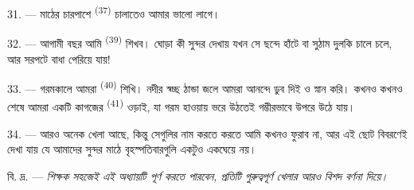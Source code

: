 31. --- মাঠের চারপাশে  \textsuperscript{(37)} চালাতেও আমার ভালো
লাগে।

32. --- আগামী বছর আমি  \textsuperscript{(39)} শিখব। ঘোড়া
কী সুন্দর দেখায় যখন সে ছন্দে হাঁটে বা সুঠাম দুলকি চালে চলে, আর সরপটে বাধা
পেরিয়ে যায়!

33. --- গরমকালে আমরা  \textsuperscript{(40)} শিখি। নদীর স্বচ্ছ
ঠান্ডা জলে আমরা আনন্দে ডুব দিই ও স্নান করি। কখনও কখনও শেষে আমরা একটি
কাগজের  \textsuperscript{(41)} ওড়াই, যা গরম হাওয়ায় ভরে উঠতেই
গম্ভীরভাবে উপরে উঠে যায়।

34. --- আরও অনেক খেলা আছে, কিন্তু সেগুলির নাম করতে করতে আমি কখনও ফুরাব
না, আর এই ছোট বিবরণেই দেখা যায় যে আমাদের সুন্দর মাঠে বৃহস্পতিবারগুলি
একটুও একঘেয়ে নয়।

বি. দ্র. --- \textit{শিক্ষক সহজেই এই অধ্যায়টি পূর্ণ করতে পারবেন, প্রতিটি
গুরুত্বপূর্ণ খেলার আরও বিশদ বর্ণনা দিয়ে।}
\VUsaut{6.0mm}
\VUfilet{22mm}
